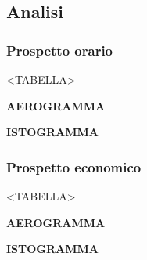 \subsection{Analisi}

\subsubsection{Prospetto orario}

<TABELLA>


\textbf{AEROGRAMMA}


\textbf{ISTOGRAMMA}

\subsubsection{Prospetto economico}

<TABELLA>


\textbf{AEROGRAMMA}


\textbf{ISTOGRAMMA}

